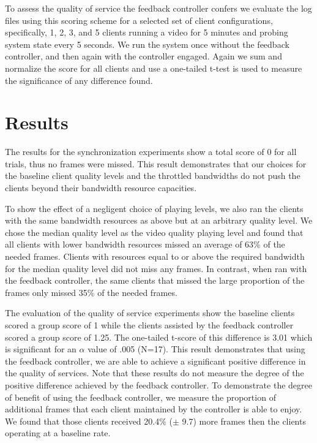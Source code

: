 \documentclass{sig-alternate}
\begin{document}
To assess the quality of service the feedback controller confers we
evaluate the log files using this scoring scheme for a selected set of
client configurations, specifically, 1, 2, 3, and 5 clients running a
video for 5 minutes and probing system state every 5 seconds.  We run
the system once without the feedback controller, and then again with
the controller engaged.  Again we sum and normalize the score for all
clients and use a one-tailed t-test is used to measure the
significance of any difference found.


\section{Results} \label{results}

The results for the synchronization experiments show a total score of
0 for all trials, thus no frames were missed.  This result
demonstrates that our choices for the baseline client quality levels
and the throttled bandwidths do not push the clients beyond their
bandwidth resource capacities.

To show the effect of a negligent choice of playing levels, we also
ran the clients with the same bandwidth resources as above but at an
arbitrary quality level.  We chose the median quality level as the
video quality playing level and found that all clients with lower
bandwidth resources missed an average of 63\% of the needed frames.
Clients with resources equal to or above the required bandwidth for
the median quality level did not miss any frames.  In contrast, when
ran with the feedback controller, the same clients that missed the
large proportion of the frames only missed 35\% of the needed frames.

The evaluation of the quality of service experiments show the baseline
clients scored a group score of 1 while the clients assisted by the
feedback controller scored a group score of 1.25.  The one-tailed
t-score of this difference is 3.01 which is significant for an
$\alpha$ value of .005 (N=17).  This result demonstrates that using
the feedback controller, we are able to achieve a significant positive
difference in the quality of services.  Note that these results do not
measure the degree of the positive difference achieved by the feedback
controller.  To demonstrate the degree of benefit of using the
feedback controller, we measure the proportion of additional frames
that each client maintained by the controller is able to enjoy.  We
found that those clients received 20.4\% ($\pm$ 9.7) more frames then
the clients operating at a baseline rate.
\end{document}

